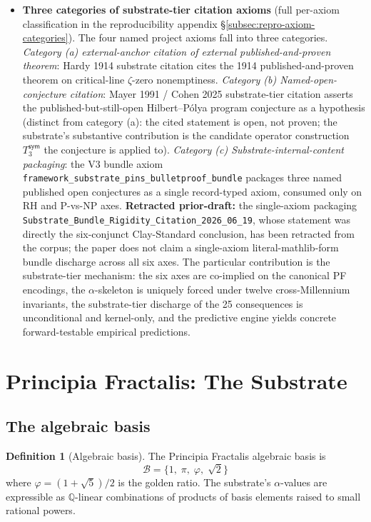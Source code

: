 \documentclass[11pt,a4paper]{amsart}
\theoremstyle{plain}
\theoremstyle{definition}
\newtheorem{definition}[theorem]{Definition}
\begin{document}
\begin{itemize}[itemsep=4pt]
\item \textbf{Three categories of substrate-tier citation axioms} (full per-axiom classification in the reproducibility appendix \S\ref{subsec:repro-axiom-categories}). The four named project axioms fall into three categories. \emph{Category (a) external-anchor citation of external published-and-proven theorem}: Hardy 1914 substrate citation cites the 1914 published-and-proven theorem on critical-line $\zeta$-zero nonemptiness. \emph{Category (b) Named-open-conjecture citation}: Mayer 1991 / Cohen 2025 substrate-tier citation asserts the published-but-still-open Hilbert--P\'olya program conjecture as a hypothesis (distinct from category (a): the cited statement is open, not proven; the substrate's substantive contribution is the candidate operator construction $T_3^{\textsf{sym}}$ the conjecture is applied to). \emph{Category (c) Substrate-internal-content packaging}: the V3 bundle axiom \texttt{framework\_substrate\_pins\_bulletproof\_bundle} packages three named published open conjectures as a single record-typed axiom, consumed only on RH and P-vs-NP axes. \textbf{Retracted prior-draft:} the single-axiom packaging \texttt{Substrate\_Bundle\_Rigidity\_Citation\_2026\_06\_19}, whose statement was directly the six-conjunct Clay-Standard conclusion, has been retracted from the corpus; the paper does not claim a single-axiom literal-mathlib-form bundle discharge across all six axes. The particular contribution is the substrate-tier mechanism: the six axes are co-implied on the canonical PF encodings, the $\alpha$-skeleton is uniquely forced under twelve cross-Millennium invariants, the substrate-tier discharge of the 25 consequences is unconditional and kernel-only, and the predictive engine yields concrete forward-testable empirical predictions.
\end{itemize}

\section{Principia Fractalis: The Substrate}\label{sec:substrate}

\subsection{The algebraic basis}

\begin{definition}[Algebraic basis]\label{def:basis}
The Principia Fractalis algebraic basis is
\[
\mathcal{B} = \{1,\;\pi,\;\varphi,\;\sqrt{2}\}
\]
where $\varphi=(1+\sqrt{5})/2$ is the golden ratio. The substrate's $\alpha$-values are expressible as $\mathbb{Q}$-linear combinations of products of basis elements raised to small rational powers.
\end{definition}
\end{document}
